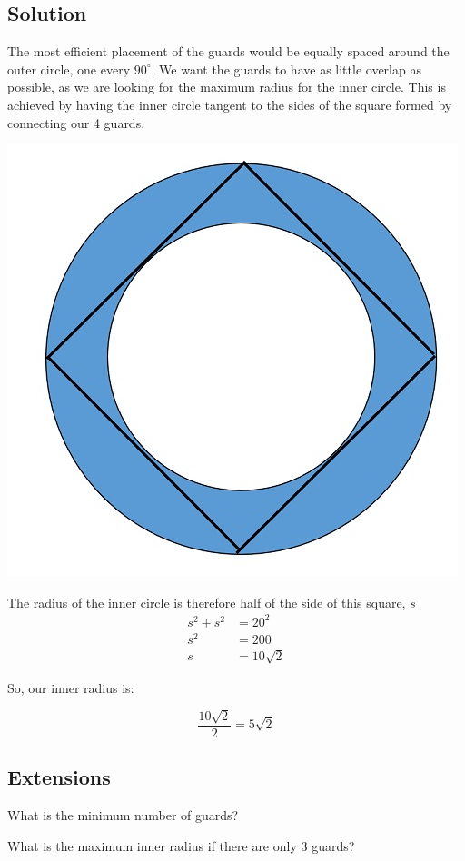 \documentclass{book}
\begin{document}
\subsection{Solution}
The most efficient placement of the guards would be equally spaced around the outer circle, one every \(90^{\circ}\). We want the guards to have as little overlap as possible, as we are looking for the maximum radius for the inner circle. This is achieved by having the inner circle tangent to the sides of the square formed by connecting our 4 guards.
\begin{center}
\includegraphics{annulus2}
\end{center}

The radius of the inner circle is therefore half of the side of this square, \(s\)
\begin{align*}
  s^2+s^2&=20^2\\
  s^2&=200\\
  s&=10\sqrt{2}
\end{align*}

So, our inner radius is:

\[\frac{10\sqrt{2}}{2}=\boxed{5\sqrt{2}}\]
\subsection{Extensions}
What is the minimum number of guards?

What is the maximum inner radius if there are only 3 guards?
\end{document}
